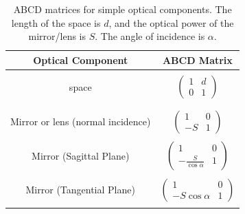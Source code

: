 \begin{table}
	\centering
	\begin{tabular}{|c | c |}
		\hline 
		Optical Component & ABCD Matrix \\
		\hline & \\
		space & $\begin{pmatrix} 1 & d \\ 0 &1\end{pmatrix}$ \\ & \\
		\hline & \\
		Mirror or lens (normal incidence) & $\begin{pmatrix} 1 & 0 \\ -S & 1\end{pmatrix}$\\ & \\
		Mirror (Sagittal Plane) & $\begin{pmatrix} 1 & 0 \\ -\frac{S}{\cos\alpha} & 1\end{pmatrix}$\\ & \\
		Mirror (Tangential Plane) & $\begin{pmatrix} 1 & 0 \\ -S\cos\alpha & 1\end{pmatrix}$\\ & \\
		\hline
	\end{tabular}
		\caption[ABCD matrices for simple optical components]{ABCD matrices for simple optical components. The length of the space is $d$, and the optical power of the mirror/lens is $S$. The angle of incidence is $\alpha$.}
\label{tab:optical_components_ABCD}
\end{table}
